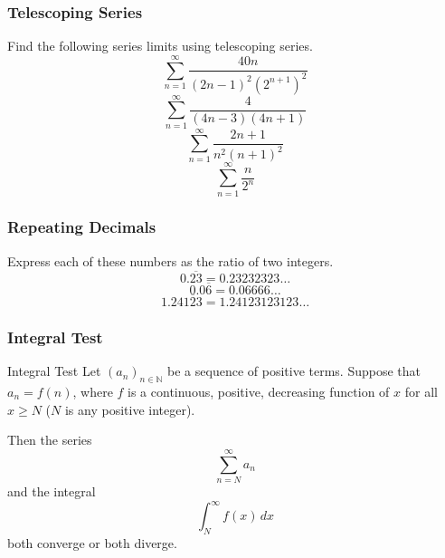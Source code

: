 \documentclass[xcolor=dvipsnames]{beamer}
\begin{document}
\begin{frame}
  \frametitle{Telescoping Series}
{\ubung} Find the following series limits using telescoping series.
\begin{equation}
  \label{eq:eiphohng}
  \sum_{n=1}^{\infty}\frac{40n}{(2n-1)^{2}(2^{n+1})^{2}}
\end{equation}
\begin{equation}
  \label{eq:ierohghu}
  \sum_{n=1}^{\infty}\frac{4}{(4n-3)(4n+1)}
\end{equation}
\begin{equation}
  \label{eq:uunguexo}
  \sum_{n=1}^{\infty}\frac{2n+1}{n^{2}(n+1)^{2}}
\end{equation}
\begin{equation}
  \label{eq:quaejich}
  \sum_{n=1}^{\infty}\frac{n}{2^{n}}
\end{equation}
\end{frame}

\begin{frame}
  \frametitle{Repeating Decimals}
  Express each of these numbers as the ratio of two integers.
  \begin{equation}
    \label{eq:aijeetha}
    0.\overline{23}=0.23232323{\ldots}
  \end{equation}
  \begin{equation}
    \label{eq:axohthee}
    0.0\overline{6}=0.06666{\ldots}
  \end{equation}
  \begin{equation}
    \label{eq:amoofugh}
    1.24\overline{123}=1.24123123123{\ldots}
  \end{equation}
\end{frame}

\begin{frame}
  \frametitle{Integral Test}
  \begin{block}{Integral Test}
    Let $\left(a_{n}\right)_{n\in\mathbb{N}}$ be a sequence of
    positive terms. Suppose that $a_{n}=f(n)$, where $f$ is a
    continuous, positive, decreasing function of $x$ for all
    $x\geq{}N$ ($N$ is any positive integer). 
  \end{block}
  Then the series
  \begin{equation}
    \label{eq:aegahiox}
    \sum_{n=N}^{\infty}a_{n}
  \end{equation}
  and the integral
  \begin{equation}
    \label{eq:iopheigh}
    \int_{N}^{\infty}f(x)\,dx
  \end{equation}
both converge or both diverge.
\end{frame}
\end{document}
